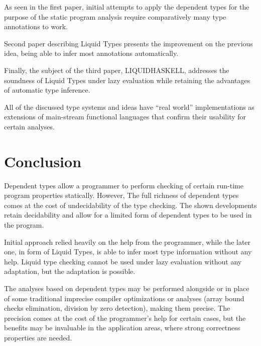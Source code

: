\documentclass[a4paper,UKenglish]{lipics-v2016}
\begin{document}
As seen in the first paper, initial attempts to apply the dependent types for
the purpose of the static program analysis require comparatively many type
annotations to work.

Second paper describing Liquid Types presents the improvement on the previous
idea, being able to infer most annotations automatically.

Finally, the subject of the third paper, LIQUIDHASKELL, addresses the soundness
of Liquid Types under lazy evaluation while retaining the advantages of
automatic type inference.

All of the discussed type systems and ideas have ``real world'' implementations
as extensions of main-stream functional languages that confirm their usability
for certain analyses.

\section{Conclusion}

Dependent types allow a programmer to perform checking of certain run-time
program properties statically. However, The full richness of dependent types
comes at the cost of undecidability of the type checking. The shown
developments retain decidability and allow for a limited form of dependent
types to be used in the program.

Initial approach relied heavily on the help from the programmer, while the
later one, in form of Liquid Types, is able to infer most type information
without any help. Liquid type checking cannot be used under lazy evaluation
without any adaptation, but the adaptation is possible.

The analyses based on dependent types may be performed alongside or in place of
some traditional imprecise compiler optimizations or analyses (array bound
checks elimination, division by zero detection), making them precise. The
precision comes at the cost of the programmer's help for certain cases, but the
benefits may be invaluable in the application areas, where strong correctness
properties are needed.





\end{document}
